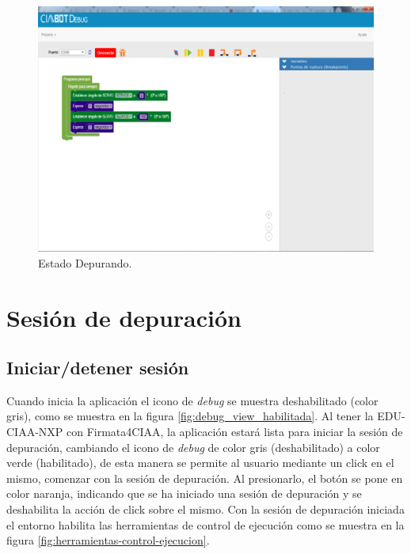 \begin{figure}[!htbp]
	\begin{center}  %
		\includegraphics[width=15cm]{./Figures/debug-debug.png}
		\par\caption{Estado Depurando.}\label{fig:debug}
	\end{center}
\end{figure}


\section{Sesión de depuración}
\label{sec:Sesión de depuración}

\subsection{Iniciar/detener sesión}
\label{subsec:Iniciar/detener sesión}

Cuando inicia la aplicación el icono de \emph{debug} se muestra deshabilitado (color gris), como se muestra en la figura \ref{fig:debug_view_habilitada}.
Al tener la EDU-CIAA-NXP con Firmata4CIAA, la aplicación estará lista para iniciar la sesión de depuración, cambiando el icono de \emph{debug} de color gris (deshabilitado) a color verde (habilitado), de esta manera se permite al usuario mediante un click en el mismo, comenzar con la sesión de depuración. Al presionarlo, el botón se pone en color naranja, indicando que se ha iniciado una sesión de depuración y se deshabilita la acción de click sobre el mismo. Con la sesión de depuración iniciada el entorno habilita las herramientas de control de ejecución como se muestra en la figura \ref{fig:herramientas-control-ejecucion}.

